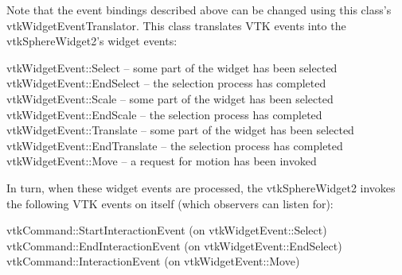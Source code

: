 Note that the event bindings described above can be changed using this class's vtk\-Widget\-Event\-Translator. This class translates V\-T\-K events into the vtk\-Sphere\-Widget2's widget events\-: 
\begin{DoxyPre}
   vtkWidgetEvent::Select -- some part of the widget has been selected
   vtkWidgetEvent::EndSelect -- the selection process has completed
   vtkWidgetEvent::Scale -- some part of the widget has been selected
   vtkWidgetEvent::EndScale -- the selection process has completed
   vtkWidgetEvent::Translate -- some part of the widget has been selected
   vtkWidgetEvent::EndTranslate -- the selection process has completed
   vtkWidgetEvent::Move -- a request for motion has been invoked
 \end{DoxyPre}


In turn, when these widget events are processed, the vtk\-Sphere\-Widget2 invokes the following V\-T\-K events on itself (which observers can listen for)\-: 
\begin{DoxyPre}
   vtkCommand::StartInteractionEvent (on vtkWidgetEvent::Select)
   vtkCommand::EndInteractionEvent (on vtkWidgetEvent::EndSelect)
   vtkCommand::InteractionEvent (on vtkWidgetEvent::Move)
 \end{DoxyPre}


